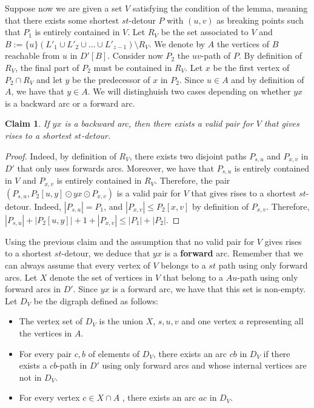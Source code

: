\documentclass[utf8,11pt]{article}
\theoremstyle{plain}
\newtheorem{claim}{Claim}[theorem]
\theoremstyle{definition}
\begin{document}
Suppose now we are given a set $V$ satisfying the condition of the lemma, meaning that there exists some shortest $st$-detour $P$ with $(u,v)$ as breaking points such that $P_1$ is entirely contained in $V$. Let $R_V$ be the set associated to $V$ and $B := \{u\} ( L'_1 \cup L'_2 \cup \dots \cup L'_{z-1} )\setminus R_V$. We denote by $A$ the vertices of $B$ reachable from $u$ in $D'[B]$. Consider now $P_2$ the $uv$-path of $P$. By definition of $R_V$, the final part of $P_2$ must be contained in $R_V$. Let $x$ be the first vertex of $P_2 \cap R_V$ and let $y$ be the predecessor of $x$ in $P_2$. Since $u \in A$ and by definition of $A$, we have that $y \in A$. We will distinghuish two cases depending on whether $yx$ is a backward arc or a forward arc. 

\begin{claim}
If $yx$ is a backward arc, then there exists a valid pair for $V$ that gives rises to a shortest $st$-detour. 
\end{claim}

\begin{proof}
    Indeed, by definition of $R_V$, there exists two disjoint paths $P_{s,u}$ and $P_{x,v}$ in $D'$ that only uses forwards arcs. Moreover, we have that $P_{s,u}$ is entirely contained in $V$ and $P_{x,v}$ is entirely contained in $R_V$. Therefore, the pair $(P_{s,u}, P_2[u,y] \odot yx \odot P_{x,v})$ is a valid pair for $V$ that gives rises to a shortest $st$-detour. Indeed, $|P_{s,u}| = P_1$, and $|P_{x,v}| \leq P_2[x,v]$ by definition of $P_{x,v}$. Therefore, $|P_{s,u}| + |P_2[u,y]| + 1 + |P_{x,v}| \leq |P_1| + |P_2|$.
\end{proof}

Using the previous claim and the assumption that no valid pair for $V$ gives rises to a shortest $st$-detour, we deduce that $yx$ is a \textbf{forward} arc. Remember that we can always assume that every vertex of $V$ belongs to a $st$ path using only forward arcs. Let $X$ denote the set of vertices in $V$ that belong to a $Au$-path using only forward arcs in $D'$. Since $yx$ is a forward arc, we have that this set is non-empty. Let $D_{V}$ be the digraph defined as follows: 

\begin{itemize}
    \item The vertex set of $D_V$ is the union $X$, $s,u,v$ and one vertex $a$ representing all the vertices in $A$.  
    \item For every pair $c,b$ of elements of $D_V$, there exists an arc $cb$ in $D_V$ if there exists a $cb$-path in $D'$ using only forward arcs and whose internal vertices are not in $D_V$.
    \item For every vertex $c \in X \cap A$ , there exists an arc $ac$ in $D_V$.
\end{itemize}
\end{document}
